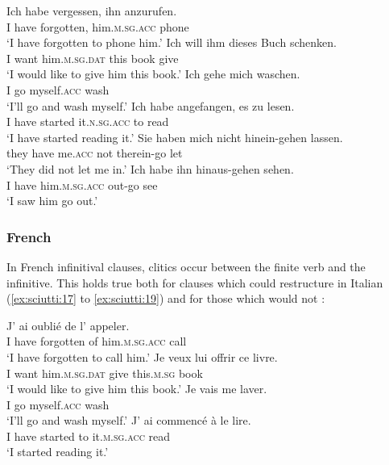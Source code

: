 \documentclass[output=paper,modfonts,nonflat,newtxmath]{langsci/langscibook}
\begin{document}
\ea \label{ex:sciutti:10}
    \gll Ich habe vergessen, ihn anzurufen.\\
        I have forgotten, him.\textsc{m.sg.acc}  phone\\
    \glt  ‘I have forgotten to phone him.’
\ex \label{ex:sciutti:11}
    \gll Ich  will ihm dieses Buch schenken.\\
        I want him.\textsc{m.sg.dat} this  book  give \\
    \glt  ‘I would like to give him this book.’
\ex \label{ex:sciutti:12}
    \gll Ich gehe mich waschen.\\
        I go myself.\textsc{acc} wash \\
    \glt  ‘I’ll go and wash myself.’
\ex \label{ex:sciutti:13}
    \gll Ich habe angefangen, es zu lesen.\\
        I have started it.\textsc{n.sg.acc} to read \\
    \glt  ‘I have started reading it.’
\ex \label{ex:sciutti:14}
    \gll Sie haben mich nicht hinein-gehen lassen.\\
         they have me.\textsc{acc}   not   therein-go let\\
    \glt  ‘They did not let me in.’
\ex \label{ex:sciutti:15}
    \gll Ich habe ihn hinaus-gehen sehen.\\
         I have him.\textsc{m.sg.acc} out-go see\\
    \glt  ‘I saw him go out.’
\z

\subsubsection{French} %

In French infinitival clauses, clitics occur between the finite verb and the infinitive. This holds true both for clauses which could restructure in Italian (\ref{ex:sciutti:17} to \ref{ex:sciutti:19}) and for those which would not :

\ea \label{ex:sciutti:16}
    \gll J’ ai oublié de l’ appeler.\\
         I have forgotten of him.\textsc{m.sg.acc} call \\
    \glt  ‘I have forgotten to call him.’
\ex \label{ex:sciutti:17}
    \gll Je veux lui offrir ce livre.\\
         I want him.\textsc{m.sg.dat} give   this.\textsc{m.sg} book \\
    \glt  ‘I would like to give him this book.’
\ex \label{ex:sciutti:18}
    \gll Je vais me laver.\\
         I go myself.\textsc{acc} wash\\
    \glt  ‘I’ll go and wash myself.’
\ex \label{ex:sciutti:19}
    \gll J’ ai commencé à le lire.\\
         I have started to it.\textsc{m.sg.acc}    read\\
    \glt  ‘I started reading it.’
\z
\end{document}

